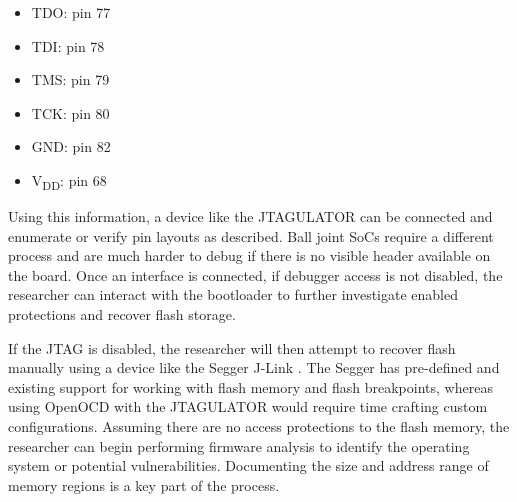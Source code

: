 \begin{itemize}
  \item TDO: pin 77
  \item TDI: pin 78
  \item TMS: pin 79
  \item TCK: pin 80
  \item GND: pin 82
  \item V\textsubscript{DD}: pin 68
\end{itemize}

Using this information, a device like the JTAGULATOR \autocite{JTAGulator2023} can be connected and enumerate or verify pin layouts as described. Ball joint SoCs require a different process and are much harder to debug if there is no visible header available on the board. Once an interface is connected, if debugger access is not disabled, the researcher can interact with the bootloader to further investigate enabled protections and recover flash storage.

If the JTAG is disabled, the researcher will then attempt to recover flash manually using a device like the Segger J-Link \autocite{SEGGERJLinkDebug}. The Segger has pre-defined and existing support for working with flash memory and flash breakpoints, whereas using OpenOCD with the JTAGULATOR would require time crafting custom configurations. Assuming there are no access protections to the flash memory, the researcher can begin performing firmware analysis to identify the operating system or potential vulnerabilities. Documenting the size and address range of memory regions is a key part of the process.